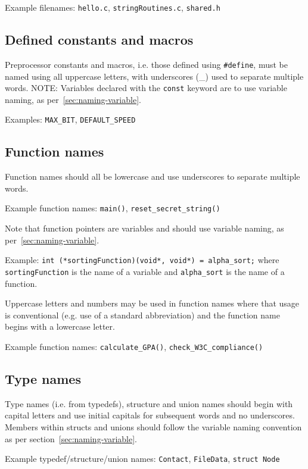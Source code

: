\documentclass{article}
\begin{document}
Example filenames: \texttt{hello.c}, \texttt{stringRoutines.c}, \texttt{shared.h}

\subsection{Defined constants and macros}
\label{sec:naming-constants}
Preprocessor constants and macros, i.e. those defined using \texttt{\#define}, must be named 
using all uppercase letters, with underscores (\_) used to separate multiple words.
NOTE: Variables declared with the \texttt{const} keyword are to use variable naming, as 
per~\ref{sec:naming-variable}.

Examples: \texttt{MAX\_BIT}, \texttt{DEFAULT\_SPEED}

\subsection{Function names}
Function names should all be lowercase and use underscores to separate multiple words.

Example function names: \texttt{main()}, \texttt{reset\_secret\_string()}

Note that function pointers are variables and should use variable naming, as per~\ref{sec:naming-variable}.

Example: \texttt{int (*sortingFunction)(void*, void*) = alpha_sort;}\newline
where \texttt{sortingFunction} is the name of a variable and \texttt{alpha_sort} is the name of a function.

Uppercase letters and numbers may be used in function names where that usage is conventional (e.g. use of a standard 
abbreviation) and the function name begins with a lowercase letter.

Example function names: \texttt{calculate\_GPA()}, \texttt{check_W3C_compliance()}

\subsection{Type names}
\label{sec:type-names}
Type names (i.e. from typedefs), structure and union names should begin with capital letters 
and use initial capitals for subsequent words and no underscores. Members within structs and unions should
follow the variable naming convention as per section~\ref{sec:naming-variable}.

Example typedef/structure/union names: \texttt{Contact}, \texttt{FileData}, \texttt{struct Node}
\end{document}
